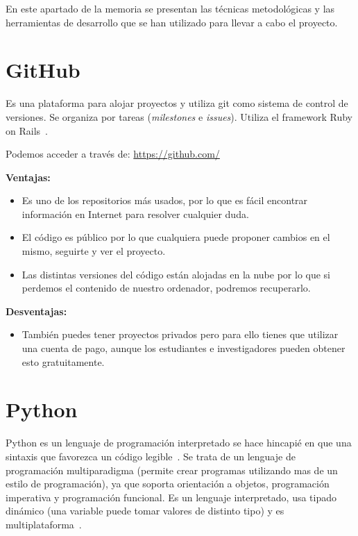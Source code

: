 
En este apartado de la memoria se presentan las técnicas metodológicas y las herramientas de desarrollo que se han utilizado para llevar a cabo el proyecto. 

\section{GitHub}
Es una plataforma para alojar proyectos y utiliza git como sistema de control de versiones. Se organiza por tareas (\textit{milestones} e \textit{issues}).
Utiliza el framework Ruby on Rails~\cite{github}.

Podemos acceder a través de: \url{https://github.com/}

\textbf{Ventajas:}

\begin{itemize}
\item Es uno de los repositorios más usados, por lo que es fácil encontrar información en Internet para resolver cualquier duda.

\item El código es público por lo que cualquiera puede proponer cambios en el mismo, seguirte y ver el proyecto.

\item Las distintas versiones del código están alojadas en la nube por lo que si perdemos el contenido de nuestro ordenador, podremos recuperarlo.
\end{itemize}

\textbf{Desventajas:}

\begin{itemize}
\item También puedes tener proyectos privados pero para ello tienes que utilizar una cuenta de pago, aunque los estudiantes e investigadores pueden obtener esto gratuitamente.
\end{itemize}

\section{Python}
Python es un lenguaje de programación interpretado se hace hincapié en que una sintaxis que favorezca un código legible~\cite{python}.
Se trata de un lenguaje de programación multiparadigma (permite crear programas utilizando mas de un estilo de programación), ya que soporta orientación a objetos, programación imperativa y programación funcional. Es un lenguaje interpretado, usa tipado dinámico (una variable puede tomar valores de distinto tipo) y es multiplataforma~\cite{wiki:python}.

